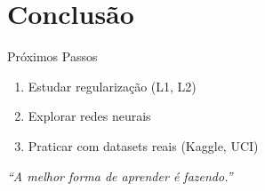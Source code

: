 \documentclass{beamer}
\begin{document}
\section{Conclusão}

\begin{frame}{Próximos Passos}
  \begin{enumerate}
    \item Estudar regularização (L1, L2)
    \item Explorar redes neurais
    \item Praticar com datasets reais (Kaggle, UCI)
  \end{enumerate}

  \bigskip
  \centering
  \textit{``A melhor forma de aprender é fazendo.''}
\end{frame}
\end{document}
